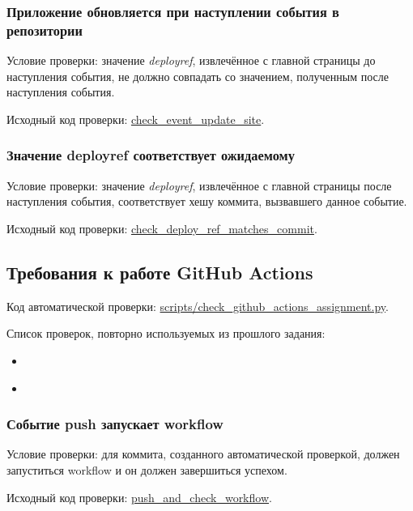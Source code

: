 \documentclass[12pt,a4paper]{article}
\begin{document}
\subsubsection{Приложение обновляется при наступлении события в репозитории}
Условие проверки: значение \textit{deployref}, извлечённое с главной страницы до наступления события, не должно
совпадать со значением, полученным после наступления события.

Исходный код проверки: \href{https://github.com/search?q=repo%3Aprafdin%2Fcheck-assignment+check_event_update_site+path%3A%2F%5Echecker%5C%2F%2F&type=code}{check\_event\_update\_site}.

\subsubsection{Значение deployref соответствует ожидаемому}
\label{sec:deployref-match}
Условие проверки: значение \textit{deployref}, извлечённое с главной страницы после наступления события, соответствует
хешу коммита, вызвавшего данное событие.

Исходный код проверки: \href{https://github.com/search?q=repo%3Aprafdin%2Fcheck-assignment+check_deploy_ref_matches_commit+path%3A%2F%5Echecker%5C%2F%2F&type=code}{check\_deploy\_ref\_matches\_commit}.

\subsection{Требования к работе GitHub Actions}
Код автоматической проверки: \href{https://github.com/search?q=repo%3Aprafdin%2Fcheck-assignment%20check_github_actions_assignment.py&type=code}
{scripts/check\_github\_actions\_assignment.py}.


Список проверок, повторно используемых из прошлого задания:
\begin{itemize}
    \item ~
    \item ~
\end{itemize}

\subsubsection{Событие push запускает workflow}
\label{sec:workflows-triggered}
Условие проверки: для коммита, созданного автоматической проверкой, должен запуститься workflow и он должен завершиться успехом.

Исходный код проверки: \href{https://github.com/search?q=repo%3Aprafdin%2Fcheck-assignment+push_and_check_workflow+path%3A%2F%5Echecker%5C%2F%2F&type=code}{push\_and\_check\_workflow}.
\end{document}
